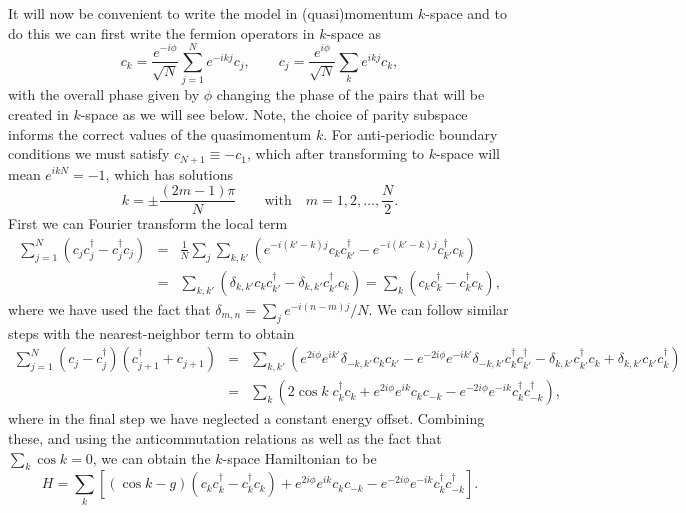 It will now be convenient to write the model in (quasi)momentum $k$-space and to do this we can first write the fermion operators in $k$-space as
\begin{equation}\label{eq:FTJW}
c_k = \frac{e^{-i \phi}}{\sqrt{N}} \sum_{j=1}^N e^{-i k j} c_j, \qquad c_j = \frac{e^{i \phi}}{\sqrt{N}} \sum_{k} e^{i k j} c_k,
\end{equation}
with the overall phase given by $\phi$ changing the phase of the pairs that will be created in $k$-space as we will see below. Note, the choice of parity subspace informs the correct values of the quasimomentum $k$. For anti-periodic boundary conditions we must satisfy $c_{N+1} \equiv - c_1$, which after transforming to $k$-space will mean $e^{i k N} = -1$, which has solutions
\begin{equation}
k = \pm \frac{\left( 2 m - 1 \right)\pi}{N} \qquad \mathrm{with} \quad m = 1,2,\dots,\frac{N}{2}.
\end{equation}
First we can Fourier transform the local term
\begin{eqnarray}
\sum_{j=1}^{N} \left( c_j c_j^\dagger - c_j^\dagger c_j \right) & = &  \frac{1}{N} \sum_j \sum_{k,k'} \left( e^{-i\left( k' - k\right)j} c_k c_{k'}^\dagger - e^{-i\left( k' - k\right)j} c_{k'}^\dagger c_k \right) \nonumber \\
& = & \sum_{k,k'} \left( \delta_{k,k'} c_k c_{k'}^\dagger - \delta_{k,k'} c_{k'}^\dagger c_k \right) = \sum_k \left( c_k c_{k}^\dagger - c_{k}^\dagger c_k \right),
\end{eqnarray}
where we have used the fact that $\delta_{m,n}=\sum_j e^{-i(n-m)j}/N$. We can follow similar steps with the nearest-neighbor term to obtain
\begin{eqnarray}
\sum_{j=1}^{N} \left( c_j - c_j^\dagger \right) \left( c_{j+1}^\dagger + c_{j+1} \right) & = & \sum_{k,k'} \left( e^{2i\phi} e^{i k'} \delta_{-k,k'} c_k c_{k'} - e^{-2i\phi} e^{-i k'} \delta_{-k,k'} c_k^\dagger c_{k'}^\dagger - \delta_{k,k'} c_{k'}^\dagger c_k + \delta_{k,k'} c_{k'} c_k^\dagger \right) \nonumber \\ 
& = & \sum_k \left( 2\cos k \; c^\dagger_k c_k + e^{2i\phi} e^{i k} c_k c_{-k} - e^{-2i\phi} e^{-i k} c_k^\dagger c_{-k}^\dagger \right),
\end{eqnarray}
where in the final step we have neglected a constant energy offset. Combining these, and using the anticommutation relations as well as the fact that $\sum_k \cos k = 0$, we can obtain the $k$-space Hamiltonian to be
\begin{equation}
H = \sum_k \left[ \left( \cos k - g\right) \left( c_k c_{k}^\dagger - c_{k}^\dagger c_{k} \right) + e^{2i\phi} e^{ik} c_k c_{-k} - e^{-2i\phi} e^{-ik} c_k^\dagger c_{-k}^\dagger \right].
\end{equation}

